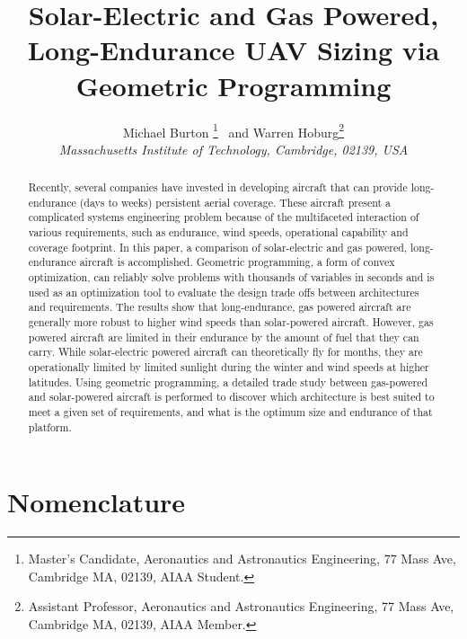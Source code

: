 \documentclass[]{aiaa-tc}%
\title{Solar-Electric and Gas Powered, Long-Endurance UAV Sizing via Geometric Programming}
\author{
  Michael Burton \thanks{Master's Candidate, Aeronautics and Astronautics Engineering, 77 Mass Ave, Cambridge MA, 02139, AIAA Student.}
  \ and Warren Hoburg\thanks{Assistant Professor, Aeronautics and Astronautics Engineering, 77 Mass Ave, Cambridge MA, 02139, AIAA Member.}\\
  {\normalsize\itshape
   Massachusetts Institute of Technology, Cambridge, 02139, USA}\\
 }
\begin{document}
\maketitle

\begin{abstract}
    Recently, several companies have invested in developing aircraft that can provide long-endurance (days to weeks) persistent aerial coverage. 
    These aircraft present a complicated systems engineering problem because of the multifaceted interaction of various requirements, such as endurance, wind speeds, operational capability and coverage footprint.
    In this paper, a comparison of solar-electric and gas powered, long-endurance aircraft is accomplished.
    Geometric programming, a form of convex optimization, can reliably solve problems with thousands of variables in seconds and is used as an optimization tool to evaluate the design trade offs between architectures and requirements.
    The results show that long-endurance, gas powered aircraft are generally more robust to higher wind speeds than solar-powered aircraft.  
    However, gas powered aircraft are limited in their endurance by the amount of fuel that they can carry. 
    While solar-electric powered aircraft can theoretically fly for months, they are operationally limited by limited sunlight during the winter and wind speeds at higher latitudes.
    Using geometric programming, a detailed trade study between gas-powered and solar-powered aircraft is performed to discover which architecture is best suited to meet a given set of requirements, and what is the optimum size and endurance of that platform.
\end{abstract}

\section*{Nomenclature}
\end{document}
